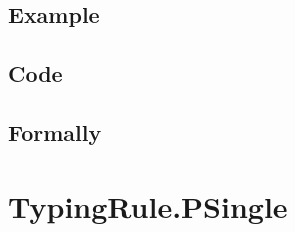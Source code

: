 \documentclass{book}
\begin{document}
  \subsection{Example}

  \subsection{Code}

\begin{emptyformal}
    \subsection{Formally}
\end{emptyformal}

 
\section{TypingRule.PSingle \label{sec:TypingRule.PSingle}}
\end{document}
